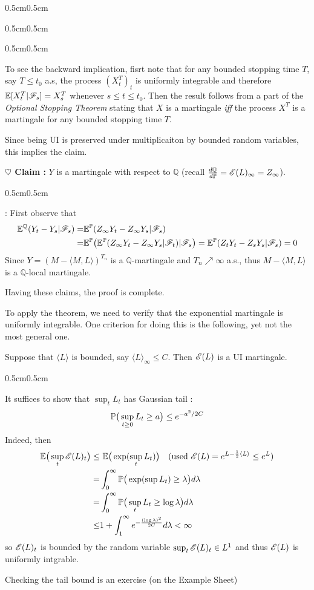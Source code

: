 \documentclass[12pt,a4paper]{article}
\newenvironment{proof}
{\begin{changemargin}{0.5cm}{0.5cm} 
	}%
	{\end{changemargin}
}
\newenvironment{subproof}
{\begin{changemargin}{0.5cm}{0.5cm} 
	}%
	{\end{changemargin}
}
\newenvironment{p}
{\begin{proof} 
	}%
	{\end{proof}
}
\begin{document}
\begin{p}
\begin{subproof}
\begin{subproof}
\quad To see the backward implication, fisrt note that for any bounded stopping time $T$, say $T\leq t_0$ a.s, the process $(X^T_t)_t$ is uniformly integrable and therefore $\mathbb{E}[X^T_t | \mathscr{F}_s] = X^T_s$ whenever $s\leq t\leq t_0$. Then the result follows from a part of the \emph{Optional Stopping Theorem} stating that $X$ is a martingale \emph{iff} the process $X^T$ is a martingale for any bounded stopping time $T$.
\end{subproof}
Since being UI is preserved under multiplicaiton by bounded random variables, this implies the claim.
\end{subproof}

\textbf{$\heartsuit$ Claim :} $Y$ is a martingale with respect to $\mathbb{Q}$ (recall $\frac{d \mathbb{Q}}{d \mathbb{P}} = \mathscr{E} (L)_{\infty} = Z_{\infty}$).
\begin{subproof}
: First observe that
\begin{align*}
\mathbb{E}^{\mathbb{Q}}(Y_t - Y_s | \mathscr{F}_s) =& \mathbb{E}^{\mathbb{P}}(Z_{\infty}Y_t - Z_{\infty} Y_s |\mathscr{F}_s ) \\
=& \mathbb{E}^{\mathbb{P}}\big( \mathbb{E}^{\mathbb{P}}(Z_{\infty}Y_t - Z_{\infty} Y_s |\mathscr{F}_t ) | \mathscr{F}_s \big) = \mathbb{E}^{\mathbb{P}} (Z_t Y_t - Z_s Y_s | \mathscr{F}_s) =0
\end{align*}
Since $Y = (M - \langle M, L \rangle)^{T_n}$ is a $\mathbb{Q}$-martingale and $T_n \nearrow \infty$ a.s., thus $M - \langle M, L \rangle$ is a $\mathbb{Q}$-local martingale.
\end{subproof}
Having these claims, the proof is complete.

\eop
\end{p}
\s

To apply the theorem, we need to verify that the exponential martingale is uniformly integrable. One criterion for doing this is the following, yet not the most general one.
\s

\prop Suppose that $\langle L \rangle$ is bounded, say $\langle L \rangle_{\infty} \leq C$. Then $\mathscr{E}(L)$ is a UI martingale.
\begin{p}
\pf It suffices to show that $\sup_t L_t$ has Gaussian tail :
\begin{align*}
\mathbb{P} \big( \sup_{t\geq 0} L_t \geq a \big) \leq e^{-a^2 /2C}
\end{align*}
Indeed, then
\begin{align*}
\mathbb{E} \big(  \sup_t \mathscr{E}(L)_t \big) \leq& \,\, \mathbb{E} \big( \exp (\sup_t L_t ) \big) \quad (\text{used } \mathscr{E}(L) = e^{L - \frac{1}{2} \langle L \rangle}  \leq e^L) \\
=& \int_0^{\infty} \mathbb{P} \big( \exp (\sup L_t) \geq \lambda \big) d\lambda \\
=& \int_0^{\infty} \mathbb{P} \big( \sup_t L_t \geq \log \lambda \big) d\lambda \\
\leq& 1+ \int_1^{\infty} e^{- \frac{(\log \lambda)^2}{2C}} d\lambda < \infty
\end{align*}
so $\mathscr{E}(L)_t$ is bounded by the random variable $\sup_t \mathscr{E}(L)_t \in L^1$ and thus $\mathscr{E}(L)$ is uniformly intgrable.
\s

Checking the tail bound is an exercise (on the Example Sheet)

\eop 
\end{p}
\s
\end{document}
